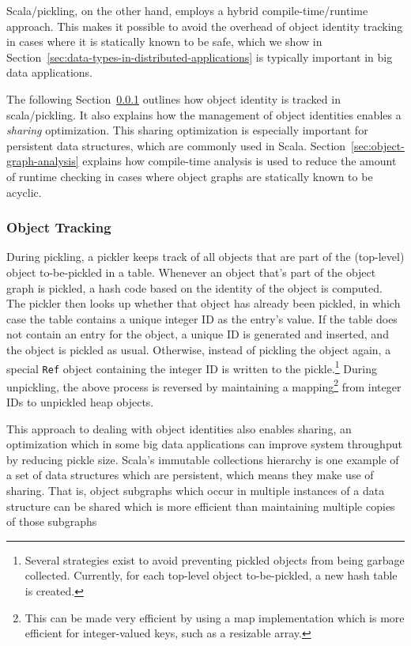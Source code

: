 \documentclass[10pt]{sigplanconf}
\theoremstyle{definition}
\theoremstyle{definition}
\begin{document}
Scala/pickling, on the other hand, employs a hybrid compile-time/runtime
approach. This makes it possible to avoid the overhead of object identity
tracking in cases where it is statically known to be safe, which we show in
Section~\ref{sec:data-types-in-distributed-applications} is typically
important in big data applications.

The following Section~\ref{sec:object-tracking} outlines how object identity
is tracked in scala/pickling. It also explains how the management of object
identities enables a {\em sharing} optimization. This sharing optimization is
especially important for persistent data structures, which are commonly used
in Scala. Section~\ref{sec:object-graph-analysis} explains how compile-time
analysis is used to reduce the amount of runtime checking in cases where
object graphs are statically known to be acyclic.

\subsubsection{Object Tracking}
\label{sec:object-tracking}

During pickling, a pickler keeps track of all objects that are part of the
(top-level) object to-be-pickled in a table. Whenever an object that's part of
the object graph is pickled, a hash code based on the identity of the object
is computed. The pickler then looks up whether that object has already been
pickled, in which case the table contains a unique integer ID as the entry's
value. If the table does not contain an entry for the object, a unique ID is
generated and inserted, and the object is pickled as usual. Otherwise, instead
of pickling the object again, a special \verb|Ref| object containing the integer ID
is written to the pickle.\footnote{Several strategies exist to avoid preventing pickled objects from being garbage collected. Currently, for each top-level object to-be-pickled, a new hash table is created.}
During unpickling, the above process is reversed by maintaining a
mapping\footnote{This can be made very efficient by using a map implementation which is more efficient for integer-valued keys, such as a resizable array.}
from integer IDs to unpickled heap objects.

This approach to dealing with object identities also enables sharing, an
optimization which in some big data applications can improve system throughput
by reducing pickle size. Scala's immutable collections hierarchy is one
example of a set of data structures which are persistent, which means they
make use of sharing. That is, object subgraphs which occur in multiple
instances of a data structure can be shared which is more efficient than
maintaining multiple copies of those subgraphs
\end{document}
